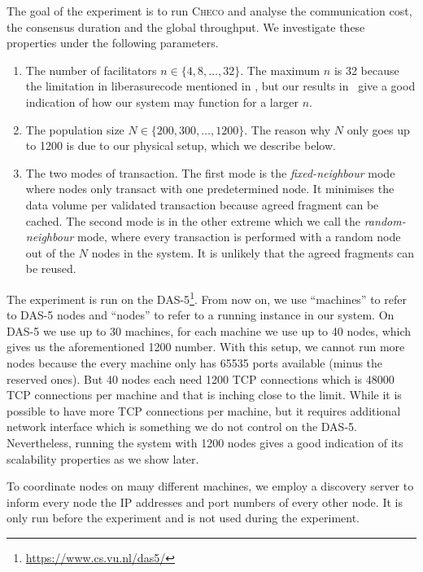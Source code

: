 The goal of the experiment is to run \textsc{Checo} and analyse the communication cost, the consensus duration and the global throughput.
We investigate these properties under the following parameters.
\begin{enumerate}
  \item The number of facilitators $n \in \{4, 8, \dots, 32\}$.
        The maximum $n$ is 32 because the limitation in liberasurecode mentioned in ,
        but our results in~ give a good indication of how our system may function for a larger $n$.
  \item The population size $N \in \{200, 300, \dots, 1200\}$.
        The reason why $N$ only goes up to 1200 is due to our physical setup, which we describe below.
  \item The two modes of transaction.
        The first mode is the \emph{fixed-neighbour} mode where nodes only transact with one predetermined node. 
        It minimises the data volume per validated transaction because agreed fragment can be cached.
        The second mode is in the other extreme which we call the \emph{random-neighbour} mode,
        where every transaction is performed with a random node out of the $N$ nodes in the system.
        It is unlikely that the agreed fragments can be reused.
\end{enumerate}

The experiment is run on the DAS-5\footnote{\url{https://www.cs.vu.nl/das5/}}.
From now on, we use ``machines'' to refer to DAS-5 nodes and ``nodes'' to refer to a running instance in our system.
On DAS-5 we use up to 30 machines, for each machine we use up to 40 nodes,
which gives us the aforementioned 1200 number.
With this setup, we cannot run more nodes because the every machine only has 65535 ports available (minus the reserved ones).
But 40 nodes each need 1200 TCP connections which is 48000 TCP connections per machine and that is inching close to the limit.
While it is possible to have more TCP connections per machine,
but it requires additional network interface which is something we do not control on the DAS-5.
Nevertheless, running the system with 1200 nodes gives a good indication of its scalability properties as we show later.

To coordinate nodes on many different machines,
we employ a discovery server to inform every node the IP addresses and port numbers of every other node.
It is only run before the experiment and is not used during the experiment.

